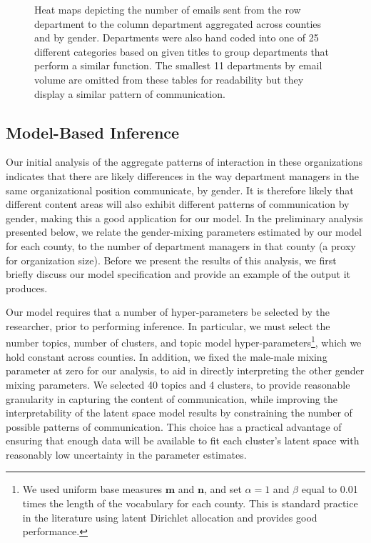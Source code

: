 \documentclass{pnastwo}
\begin{document}
\begin{article}
\begin{figure}
\begin{tabular}{cc}
\end{tabular}
\caption{\label{fig:heatmaps}Heat maps depicting the number of emails sent from the row department to the column department aggregated across counties and by gender. Departments were also hand coded into one of 25 different categories based on given titles to group departments that perform a similar function. The smallest 11 departments by email volume are omitted from these tables for readability but they display a similar pattern of communication.}
\end{figure}
	
\subsection{Model-Based Inference}
Our initial analysis of the aggregate patterns of interaction in these organizations indicates that there are likely differences in the way department managers in the same organizational position communicate, by gender. It is therefore likely that different content areas will also exhibit different patterns of communication by gender, making this a good application for our model. In the preliminary analysis presented below, we relate the gender-mixing parameters estimated by our model for each county, to the number of department managers in that county (a proxy for organization size). Before we present the results of this analysis, we first briefly discuss our model specification and provide an example of the output it produces. 

Our model requires that a number of hyper-parameters be selected by the researcher, prior to performing inference. In particular, we must select the number topics, number of clusters, and topic model hyper-parameters\footnote{We used uniform base measures $\mathbf{m}$ and $\mathbf{n}$, and set $\alpha = 1$ and $\beta$ equal to 0.01 times the length of the vocabulary for each county. This is standard practice in the literature using latent Dirichlet allocation and provides good performance.}, which we hold constant across counties. In addition, we fixed the male-male mixing parameter at zero for our analysis, to aid in directly interpreting the other gender mixing parameters. We selected 40 topics and 4 clusters, to provide reasonable granularity in capturing the content of communication, while improving the interpretability of the latent space model results by constraining the number of possible patterns of communication. This choice has a practical advantage of ensuring that enough data will be available to fit each cluster's latent space with reasonably low uncertainty in the parameter estimates. 


\end{article}
\end{document}
